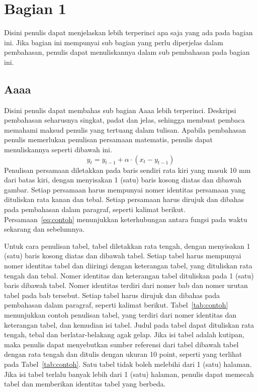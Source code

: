 \section{Bagian 1}

Disini penulis dapat menjelaskan lebih terperinci apa saja yang ada pada bagian
ini. Jika bagian ini mempunyai sub bagian yang perlu diperjelas dalam
pembahasan, penulis dapat menuliskannya dalam sub pembahasan pada bagian ini.

\subsection{Aaaa}

Disini penulis dapat membahas sub bagian Aaaa lebih terperinci. Deskripsi
pembahasan seharusnya singkat, padat dan jelas, sehingga membuat pembaca
memahami maksud penulis yang tertuang dalam tulisan. Apabila pembahasan penulis
memerlukan penulisan persamaan matematis, penulis dapat menuliskannya seperti
dibawah ini.
\begin{equation}
  y_t = y_{t-1} + \alpha \cdot \left(x_t - y_{t-1}\right)
  \label{eq:contoh}
\end{equation}
Penulisan persamaan diletakkan pada baris sendiri rata kiri yang masuk 10 mm
dari batas kiri, dengan menyisakan 1 (satu) baris kosong diatas dan dibawah
gambar. Setiap persamaan harus mempunyai nomer identitas persamaan yang
dituliskan rata kanan dan tebal. Setiap persamaan harus dirujuk dan dibahas
pada pembahasan dalam paragraf, seperti kalimat berikut.
Persamaan~\eqref{eq:contoh} menunjukkan keterhubungan antara fungsi pada waktu
sekarang dan sebelumnya.

Untuk cara penulisan tabel, tabel diletakkan rata tengah, dengan menyisakan 1
(satu) baris kosong diatas dan dibawah tabel. Setiap tabel harus mempunyai
nomer identitas tabel dan diiringi dengan keterangan tabel, yang dituliskan
rata tengah dan tebal. Nomer identitas dan keterangan tabel dituliskan pada 1
(satu) baris dibawah tabel. Nomer identitas terdiri dari nomer bab dan nomer
urutan tabel pada bab tersebut. Setiap tabel harus dirujuk dan dibahas pada
pembahasan dalam paragraf, seperti kalimat berikut. Tabel~\ref{tab:contoh}
menunjukkan contoh penulisan tabel, yang terdiri dari nomer identitas dan
keterangan tabel, dan kemudian isi tabel. Judul pada tabel dapat dituliskan
rata tengah, tebal dan berlatar-belakang agak gelap. Jika isi tabel adalah
kutipan, maka penulis dapat menyebutkan sumber referensi dari tabel dibawah
tabel dengan rata tengah dan ditulis dengan ukuran 10 point, seperti yang
terlihat pada Tabel~\ref{tab:contoh}. Satu tabel tidak boleh melebihi dari 1
(satu) halaman. Jika isi tabel terlalu banyak lebih dari 1 (satu) halaman,
penulis dapat memecah tabel dan memberikan identitas tabel yang berbeda.

